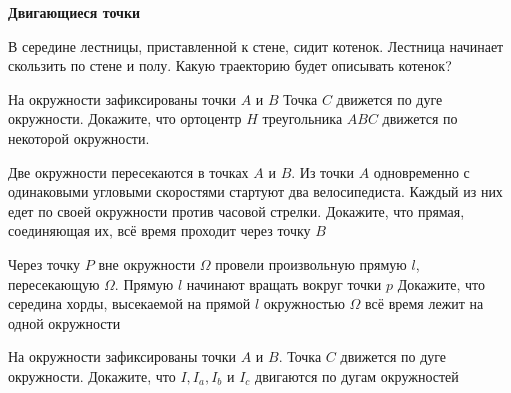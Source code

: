 \documentclass{article}
\begin{document}
    \large

    \begin{center}
        \textbf{Двигающиеся точки}
    \end{center}

    \begin{enumerate_boxed}

        \item В середине лестницы, приставленной к стене, сидит котенок.
        Лестница начинает скользить по стене и полу.
        Какую траекторию будет описывать котенок?

        \item На окружности зафиксированы точки $A$ и $B$ Точка $C$ движется по дуге окружности.
        Докажите, что ортоцентр $H$ треугольника $ABC$ движется по некоторой окружности.

        \item Две окружности пересекаются в точках $A$ и $B$.
        Из точки $A$ одновременно с одинаковыми угловыми скоростями стартуют два велосипедиста.
        Каждый из них едет по своей окружности против часовой стрелки.
        Докажите, что прямая, соединяющая их, всё время проходит через точку $B$

        \item Через точку $P$ вне окружности $\Omega$ провели произвольную прямую $l$, пересекающую $\Omega$.
        Прямую $l$ начинают вращать вокруг точки $p$ Докажите, что середина хорды, высекаемой на прямой $l$ окружностью $\Omega$ всё время лежит на одной окружности

        \item На окружности зафиксированы точки $A$ и $B$.
        Точка $C$ движется по дуге окружности.
        Докажите, что $I, I_a, I_b$ и $I_c$ двигаются по дугам окружностей

    \end{enumerate_boxed}
\end{document}
